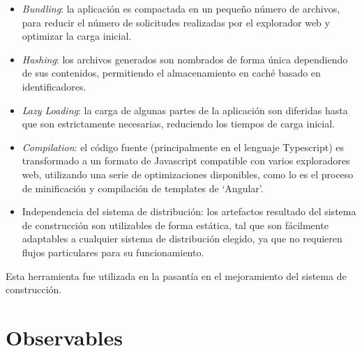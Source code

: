 \begin{itemize}
  \item \textit{Bundling}: la aplicación es compactada en un pequeño número de archivos, para reducir el número de solicitudes realizadas por el explorador web y optimizar la carga inicial.
  \item \textit{Hashing}: los archivos generados son nombrados de forma única dependiendo de sus contenidos, permitiendo el almacenamiento en caché basado en identificadores.
  \item \textit{Lazy Loading}: la carga de algunas partes de la aplicación son diferidas hasta que son estrictamente necesarias, reduciendo los tiempos de carga inicial.
  \item \textit{Compilation}: el código fuente (principalmente en el lenguaje Typescript) es transformado a un formato de Javascript compatible con varios exploradores web, utilizando una serie de optimizaciones disponibles, como lo es el proceso de minificación y compilación de templates de `Angular'.
  \item Independencia del sistema de distribución: los artefactos resultado del sistema de construcción son utilizables de forma estática, tal que son fácilmente adaptables a cualquier sistema de distribución elegido, ya que no requieren flujos particulares para su funcionamiento.
\end{itemize}

Esta herramienta fue utilizada en la pasantía en el mejoramiento del sistema de construcción.

\section{Observables}


